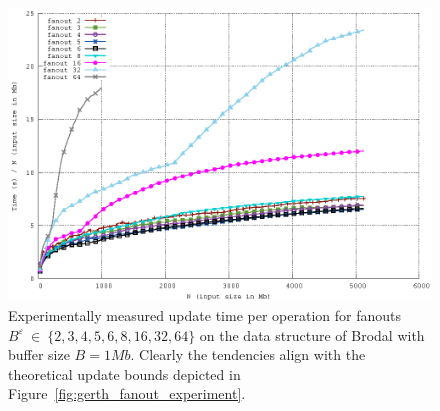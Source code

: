 \documentclass[twoside,11pt,openright]{report}
\def \epsilon {\varepsilon}
\begin{document}
\begin{figure}[h]
\begin{minipage}[t]{0.48\columnwidth}
  \label{fig:gerth_fanout_experiment_zoom}
\end{minipage}
\centering
\includegraphics[width=\textwidth]{../src/experiments/gerth_fanout_experiment_results/2016-05-06.11_52_24/time}
\caption{Experimentally measured update time per operation for fanouts $B^\epsilon~\in~\{2,3,4,5,6,8,16,32,64\}$ on the data structure of Brodal with buffer size $B = 1 Mb$. Clearly the tendencies align with the theoretical update bounds depicted in Figure~\ref{fig:gerth_fanout_experiment}.}
\label{fig:gerth_fanout_experiment_time}
\end{figure}
\end{document}
